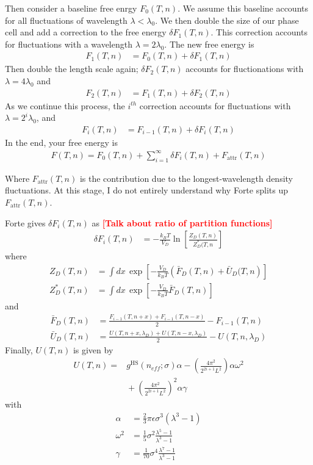 \documentclass[letterpaper,twocolumn,amsmath,amssymb,prb]{revtex4-1}
\newcommand{\kT}{\ensuremath{k_BT}}
\newcommand{\fattr}{\ensuremath{F_\text{attr}(T,n)}}
\newcommand{\1}{\ensuremath{\textbf{r}_1}}
\newcommand{\2}{\ensuremath{\textbf{r}_2}}
\newcommand{\3}{\ensuremath{\textbf{r}_3}}
\newcommand{\4}{\ensuremath{\textbf{r}_4}}
\newcommand{\fixme}[1]{\textcolor{red}{\textbf{[#1]}}}
\begin{document}
Then consider a baseline free enrgy $F_0(T,n)$. We assume this
baseline accounts for all fluctuations of wavelength $\lambda <
\lambda_0$. We then double the size of our phase cell and add a
correction to the free energy $\delta F_1(T,n)$. This correction
accounts for fluctuations with a wavelength $\lambda =
2\lambda_0$. The new free energy is
\begin{align}
  F_1(T,n) &= F_0(T,n) + \delta F_1(T,n)
\end{align}
Then double the length scale again; $\delta F_2(T,n)$ accounts for
fluctionations with $\lambda = 4\lambda_0$ and
\begin{align}
  F_2(T,n) &= F_1(T,n) + \delta F_2(T,n)
\end{align}
As we continue this process, the $i^{th}$ correction accounts for
fluctuations with $\lambda = 2^i\lambda_0$, and
\begin{align}
  F_i(T,n) &= F_{i-1}(T,n) + \delta F_i(T,n)
\end{align}
In the end, your free energy is
\begin{align}
  F(T,n) = F_0(T,n) + \sum_{i=1}^\infty\delta F_i(T,n) + \fattr
\end{align}

Where $\fattr$ is the contribution due to the longest-wavelength
density fluctuations. At this stage, I do not entirely understand why
Forte splits up $\fattr$.

Forte gives $\delta F_i(T,n)$ as
\fixme{Talk about ratio of partition functions}
\begin{align}
  \delta F_i(T,n) &= -\frac{\kT}{V_D}\ln\left[ \frac{Z_D(T,n)}{Z_D^*(T,n} \right]
\end{align}
where
\begin{align}
  Z_D(T,n) &= \int dx\, \exp\left[ -\frac{V_D}{\kT}\left( \bar{F}_D(T,n) + \bar{U}_D(T,n \right) \right] \\
  Z_D^*(T,n) &= \int dx\, \exp\left[ -\frac{V_D}{\kT}\bar{F}_D(T,n) \right]
\end{align}
and
\begin{align}
  \bar{F}_D(T,n) &= \frac{F_{i-1}(T,n+x) + F_{i-1}(T,n-x)}{2} - F_{i-1}(T,n) \\
  \bar{U}_D(T,n) &= \frac{U(T,n+x,\lambda_D) + U(T,n-x,\lambda_D)}{2} - U(T,n,\lambda_D)
\end{align}
Finally, $U(T,n)$ is given by
\begin{align}
  U(T,n) = &{} g^\text{HS}(n_{eff};\sigma)\alpha - \left( \frac{4\pi^2}{2^{2i+1}L^2} \right)\alpha\omega^2 \nonumber \\
  &{} + \left( \frac{4\pi^2}{2^{2i+1}L^2} \right)^2\alpha\gamma
\end{align}
with
\begin{align}
  \alpha &= \frac{2}{3}\pi\epsilon\sigma^3(\lambda^3 - 1) \\
  \omega^2 &= \frac{1}{5}\sigma^2\frac{\lambda^5 - 1}{\lambda^3 - 1} \\
  \gamma &= \frac{1}{70}\sigma^4\frac{\lambda^7 - 1}{\lambda^3 - 1}
\end{align}
\end{document}
